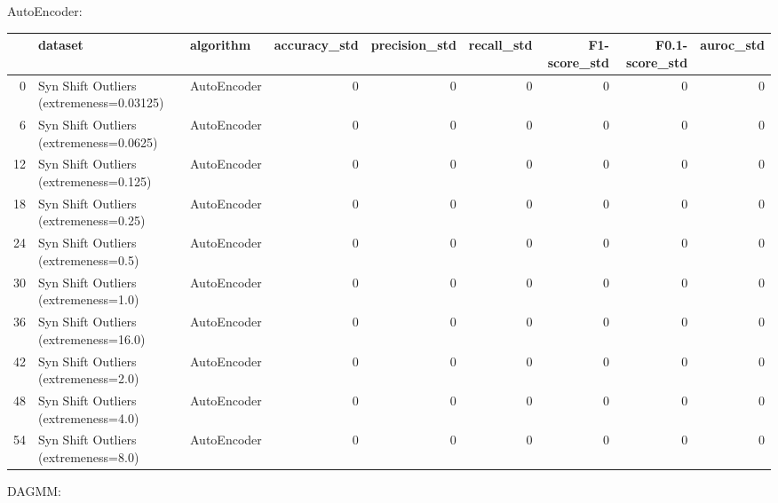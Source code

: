 AutoEncoder:

\begin{tabular}{rllrrrrrr}
\hline
    & dataset                                  & algorithm   &   accuracy\_std &   precision\_std &   recall\_std &   F1-score\_std &   F0.1-score\_std &   auroc\_std \\
\hline
  0 & Syn Shift Outliers (extremeness=0.03125) & AutoEncoder &              0 &               0 &            0 &              0 &                0 &           0 \\
  6 & Syn Shift Outliers (extremeness=0.0625)  & AutoEncoder &              0 &               0 &            0 &              0 &                0 &           0 \\
 12 & Syn Shift Outliers (extremeness=0.125)   & AutoEncoder &              0 &               0 &            0 &              0 &                0 &           0 \\
 18 & Syn Shift Outliers (extremeness=0.25)    & AutoEncoder &              0 &               0 &            0 &              0 &                0 &           0 \\
 24 & Syn Shift Outliers (extremeness=0.5)     & AutoEncoder &              0 &               0 &            0 &              0 &                0 &           0 \\
 30 & Syn Shift Outliers (extremeness=1.0)     & AutoEncoder &              0 &               0 &            0 &              0 &                0 &           0 \\
 36 & Syn Shift Outliers (extremeness=16.0)    & AutoEncoder &              0 &               0 &            0 &              0 &                0 &           0 \\
 42 & Syn Shift Outliers (extremeness=2.0)     & AutoEncoder &              0 &               0 &            0 &              0 &                0 &           0 \\
 48 & Syn Shift Outliers (extremeness=4.0)     & AutoEncoder &              0 &               0 &            0 &              0 &                0 &           0 \\
 54 & Syn Shift Outliers (extremeness=8.0)     & AutoEncoder &              0 &               0 &            0 &              0 &                0 &           0 \\
\hline
\end{tabular}

DAGMM:

